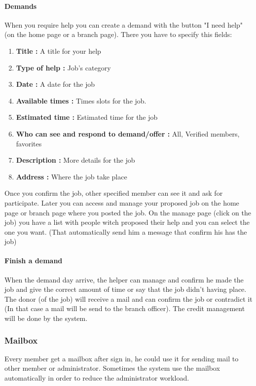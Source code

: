 \documentclass[11pt, a4paper]{article}      %
\begin{document}
\paragraph{Demands}
When you require help you can create a demand with the button "I need help" (on the home page or a branch page). There you have to specify this fields:
\begin{enumerate}
    \item \textbf{Title :} A title for your help
    \item \textbf{Type of help :} Job's category
    \item \textbf{Date :} A date for the job
    \item \textbf{Available times :} Times slots for the job.
    \item \textbf{Estimated time :} Estimated time for the job
    \item \textbf{Who can see and respond to demand/offer :} All, Verified members, favorites
    \item \textbf{Description :} More details for the job
    \item \textbf{Address :} Where the job take place
\end{enumerate}
Once you confirm the job, other specified member can see it and ask for participate.
Later you can access and manage your proposed job on the home page or branch page where you posted the job. On the manage page (click on the job) you have a list with people witch proposed their help and you can select the one you want. (That automatically send him a message that confirm his has the job)

\paragraph{Finish a demand}
When the demand day arrive, the helper can manage and confirm he made the job and give the correct amount of time or say that the job didn't having place.
The donor (of the job) will receive a mail and can confirm the job or contradict it (In that case a mail will be send to the branch officer). The credit management will be done by the system.  

\subsubsection{Mailbox}

Every member get a mailbox after sign in, he could use it for sending mail to other member or administrator. Sometimes the system use the mailbox automatically in order to reduce the administrator workload.
\end{document}
